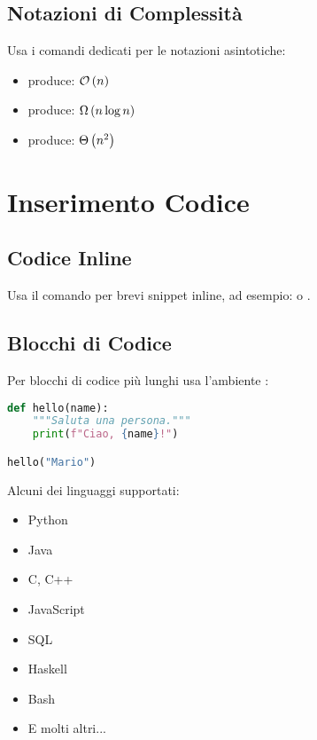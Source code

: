 \documentclass{csnotes}
\begin{document}
\subsection{Notazioni di Complessità}

\begin{example}
Usa i comandi dedicati per le notazioni asintotiche:
\begin{itemize}
    \item {} produce: \(\mathcal{O}\left(n\right)\)
    \item {} produce: \(\Omega\left(n \log n\right)\)
    \item {} produce: \(\Theta\left(n^2\right)\)
\end{itemize}
\end{example}


\section{Inserimento Codice}

\subsection{Codice Inline}

Usa il comando  per brevi snippet inline, 
ad esempio:  o .

\subsection{Blocchi di Codice}

\begin{example}
Per blocchi di codice più lunghi usa l'ambiente :
\end{example}

\begin{lstlisting}[language=Python, caption=Esempio base]
def hello(name):
    """Saluta una persona."""
    print(f"Ciao, {name}!")

hello("Mario")
\end{lstlisting}

\begin{note}
Alcuni dei linguaggi supportati:
\begin{itemize}
    \item Python
    \item Java
    \item C, C++
    \item JavaScript
    \item SQL
    \item Haskell
    \item Bash
    \item E molti altri...
\end{itemize}
\end{note}
\end{document}
